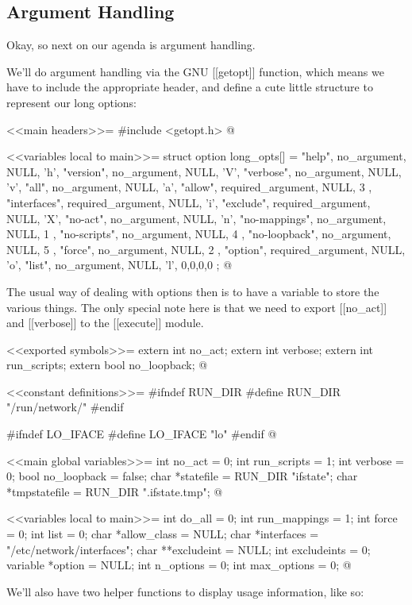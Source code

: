 \documentclass{article}
\begin{document}
\subsection{Argument Handling}

Okay, so next on our agenda is argument handling.

We'll do argument handling via the GNU [[getopt]] function, which
means we have to include the appropriate header, and define a cute
little structure to represent our long options:

<<main headers>>=
#include <getopt.h>
@

<<variables local to main>>=
struct option long_opts[] = {
	{"help",        no_argument,       NULL, 'h'},
	{"version",     no_argument,       NULL, 'V'},
	{"verbose",     no_argument,       NULL, 'v'},
	{"all",         no_argument,       NULL, 'a'},
	{"allow",	required_argument, NULL,  3 },
	{"interfaces",  required_argument, NULL, 'i'},
	{"exclude",     required_argument, NULL, 'X'},
	{"no-act",      no_argument,       NULL, 'n'},
	{"no-mappings", no_argument,       NULL,  1 },
	{"no-scripts",  no_argument,       NULL,  4 },
	{"no-loopback", no_argument,       NULL,  5 },
	{"force",       no_argument,       NULL,  2 },
	{"option",      required_argument, NULL, 'o'},
	{"list",        no_argument,       NULL, 'l'},
	{0,0,0,0}
};
@ 

The usual way of dealing with options then is to have a variable to store
the various things. The only special note here is that we need to export
[[no_act]] and [[verbose]] to the [[execute]] module.

<<exported symbols>>=
extern int no_act;
extern int verbose;
extern int run_scripts;
extern bool no_loopback;
@

<<constant definitions>>=
#ifndef RUN_DIR
#define RUN_DIR "/run/network/"
#endif

#ifndef LO_IFACE
#define LO_IFACE "lo"
#endif
@ 

<<main global variables>>=
int no_act = 0;
int run_scripts = 1;
int verbose = 0;
bool no_loopback = false;
char *statefile = RUN_DIR "ifstate";
char *tmpstatefile = RUN_DIR ".ifstate.tmp";
@

<<variables local to main>>=
int do_all = 0;
int run_mappings = 1;
int force = 0;
int list = 0;
char *allow_class = NULL;
char *interfaces = "/etc/network/interfaces";
char **excludeint = NULL;
int excludeints = 0;
variable *option = NULL;
int n_options = 0;
int max_options = 0;
@ 

We'll also have two helper functions to display usage information,
like so:
\end{document}

